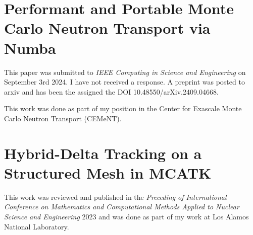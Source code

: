 \section{Performant and Portable Monte Carlo Neutron Transport via Numba}
\label{app:cise}

This paper was submitted to \textit{IEEE Computing in Science and Engineering} on September 3rd 2024. 
I have not received a response.
A preprint was posted to arxiv and has been the assigned the DOI 10.48550/arXiv.2409.04668.

This work was done as part of my position in the Center for Exascale Monte Carlo Neutron Transport (CEMeNT).






\section{Hybrid-Delta Tracking on a Structured Mesh in MCATK}

This work was reviewed and published in the \textit{Preceding of International Conference on Mathematics and Computational Methods Applied to Nuclear Science and Engineering} 2023 and was done as part of my work at Los Alamos National Laboratory.


